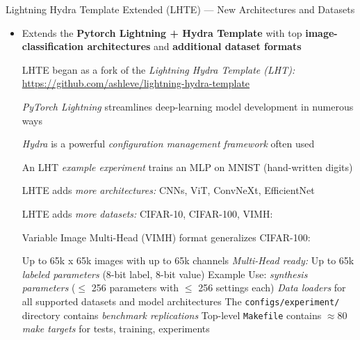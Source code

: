 \begin{slide}[\slideopts,toc={Lightning Hydra Template Ext}]{Lightning Hydra Template Extended (LHTE) --- New Architectures and Datasets}


\vspace{-1em}


  \begin{itemize}

    \item Extends the \textbf{Pytorch Lightning + Hydra Template} with top \textbf{image-classification architectures} and \textbf{additional dataset formats}

    \mpitem LHTE began as a fork of the \emph{Lightning Hydra Template (LHT):} \url{https://github.com/ashleve/lightning-hydra-template}
    \begin{itemize}

      \mpitem \emph{PyTorch Lightning} streamlines deep-learning model development in
      numerous ways

      \mpitem \emph{Hydra} is a powerful \emph{configuration management framework} often used

      \mpitem An LHT \emph{example experiment} trains an MLP on MNIST (hand-written digits)

    \end{itemize}

    \mpitem LHTE adds \emph{more architectures:} CNNs,  ViT, ConvNeXt, EfficientNet

    \mpitem LHTE adds \emph{more datasets:} CIFAR-10, CIFAR-100, VIMH:

    \mpitem Variable Image Multi-Head (VIMH) format generalizes CIFAR-100:
    \begin{itemize}
      \mpitem Up to 65k x 65k images with up to 65k channels %
      \mpitem \emph{Multi-Head ready:} Up to 65k \emph{labeled parameters} (8-bit label, 8-bit value)
      \mpitem Example Use: \emph{synthesis parameters} ($\le$ 256 parameters with $\le$ 256 settings each)
      \mpitem \emph{Data loaders} for all supported datasets and model architectures
      \mpitem The \texttt{configs/experiment/} directory contains \emph{benchmark replications} %
      \mpitem Top-level \texttt{Makefile} contains $\approx 80$ \emph{make targets} for tests, training, experiments
    \end{itemize}
  \end{itemize}

\end{slide}

